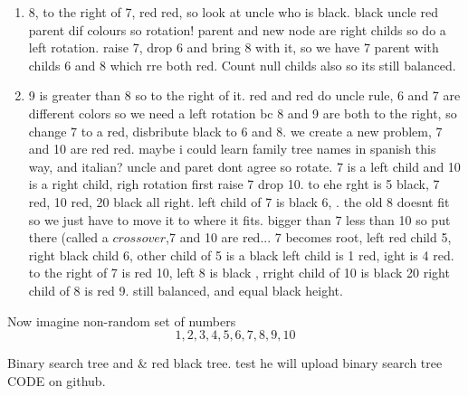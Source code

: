 \documentclass[]{article}
\begin{document}
\begin{enumerate}
\item{8, to the right of 7, red red, so look at uncle who is black. black uncle red parent dif colours so rotation! parent and new node are right childs so do a left rotation. raise 7, drop 6 and bring 8 with it, so we have 7 parent with childs 6 and 8 which rre both red. Count null childs also  so its still balanced.}
\item{9 is greater than 8 so to the right of it. red and red  do uncle rule, 6 and 7 are different colors so we need a left rotation bc 8 and 9 are both to the right, so  change 7 to a red, disbribute black to 6 and 8. we create a new problem, 7 and 10 are red red. maybe i could learn family tree names in spanish this way, and italian? uncle and paret dont agree so rotate. 7 is a left child and 10 is a right child, righ rotation first raise 7 drop 10.  to ehe rght is 5 black, 7 red, 10 red, 20 black all right. left child of 7 is black 6, . the old 8 doesnt fit so we just have to move it to where it fits. bigger than 7 less than 10 so put there (called a $\textit{crossover}$,7 and 10 are red... 7 becomes root, left red child 5, right black child 6, other child of 5 is a black left child is 1 red, ight is 4 red. to the right of 7 is red 10, left 8 is black , rright child of 10 is black 20 right child of 8 is red 9. still balanced, and equal black height.}
\end{enumerate}


Now imagine non-random set of numbers
\[ 1,2,3,4,5,6,7,8,9,10\]

Binary search tree and \& red black tree. test he will upload binary search tree CODE on github. 
\end{document}
